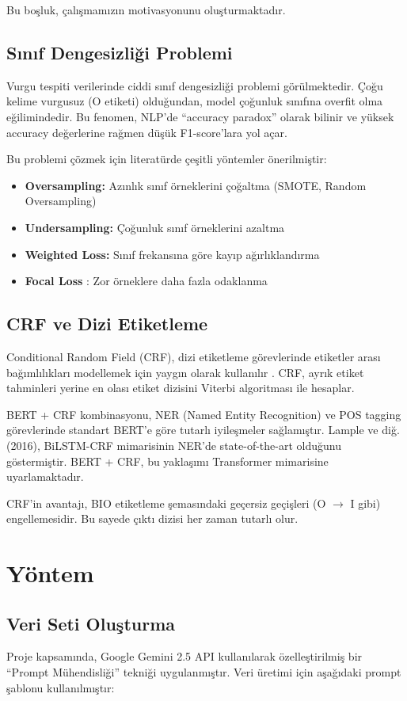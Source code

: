 \documentclass[conference]{IEEEtran}
\begin{document}
Bu boşluk, çalışmamızın motivasyonunu oluşturmaktadır.

\subsection{Sınıf Dengesizliği Problemi}
Vurgu tespiti verilerinde ciddi sınıf dengesizliği problemi görülmektedir. Çoğu kelime vurgusuz (O etiketi) olduğundan, model çoğunluk sınıfına overfit olma eğilimindedir. Bu fenomen, NLP'de ``accuracy paradox'' olarak bilinir ve yüksek accuracy değerlerine rağmen düşük F1-score'lara yol açar.

Bu problemi çözmek için literatürde çeşitli yöntemler önerilmiştir:
\begin{itemize}
    \item \textbf{Oversampling:} Azınlık sınıf örneklerini çoğaltma (SMOTE, Random Oversampling)
    \item \textbf{Undersampling:} Çoğunluk sınıf örneklerini azaltma
    \item \textbf{Weighted Loss:} Sınıf frekansına göre kayıp ağırlıklandırma
    \item \textbf{Focal Loss} \cite{focalloss}: Zor örneklere daha fazla odaklanma
\end{itemize}

\subsection{CRF ve Dizi Etiketleme}
Conditional Random Field (CRF), dizi etiketleme görevlerinde etiketler arası bağımlılıkları modellemek için yaygın olarak kullanılır \cite{crfner}. CRF, ayrık etiket tahminleri yerine en olası etiket dizisini Viterbi algoritması ile hesaplar.

BERT + CRF kombinasyonu, NER (Named Entity Recognition) ve POS tagging görevlerinde standart BERT'e göre tutarlı iyileşmeler sağlamıştır. Lample ve diğ. (2016), BiLSTM-CRF mimarisinin NER'de state-of-the-art olduğunu göstermiştir. BERT + CRF, bu yaklaşımı Transformer mimarisine uyarlamaktadır.

CRF'in avantajı, BIO etiketleme şemasındaki geçersiz geçişleri (O $\rightarrow$ I gibi) engellemesidir. Bu sayede çıktı dizisi her zaman tutarlı olur.

\section{Yöntem}

\subsection{Veri Seti Oluşturma}
Proje kapsamında, Google Gemini 2.5 API kullanılarak özelleştirilmiş bir ``Prompt Mühendisliği'' tekniği uygulanmıştır. Veri üretimi için aşağıdaki prompt şablonu kullanılmıştır:
\end{document}
